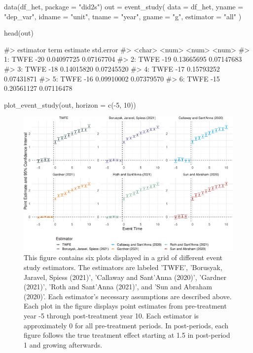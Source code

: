 \begin{Schunk}
\begin{Sinput}
data(df_het, package = "did2s")
out = event_study(
  data = df_het, yname = "dep_var", idname = "unit",
  tname = "year", gname = "g", estimator = "all"
)
\end{Sinput}
\end{Schunk}

\begin{Schunk}
\begin{Sinput}
head(out)
\end{Sinput}
\begin{Soutput}
#>    estimator  term   estimate  std.error
#>       <char> <num>      <num>      <num>
#> 1:      TWFE   -20 0.04097725 0.07167704
#> 2:      TWFE   -19 0.13665695 0.07147683
#> 3:      TWFE   -18 0.14015820 0.07245520
#> 4:      TWFE   -17 0.15793252 0.07431871
#> 5:      TWFE   -16 0.09910002 0.07379570
#> 6:      TWFE   -15 0.20561127 0.07116478
\end{Soutput}
\end{Schunk}

\begin{Schunk}
\begin{Sinput}
plot_event_study(out, horizon = c(-5, 10))
\end{Sinput}
\begin{figure}
\includegraphics[width=1\linewidth]{did2s_files/figure-latex/es-alternatives-1} \caption[This figure contains six plots displayed in a grid of different event study estimators]{This figure contains six plots displayed in a grid of different event study estimators. The estimators are labeled 'TWFE', 'Borusyak, Jaravel, Spiess (2021)', 'Callaway and Sant'Anna (2020)', 'Gardner (2021)', 'Roth and Sant'Anna (2021)', and 'Sun and Abraham (2020)'. Each estimator's necessary assumptions are described above. Each plot in the figure displays point estimates from pre-treatment year -5 through post-treatment year 10. Each estimator is approximately 0 for all pre-treatment periods. In post-periods, each figure follows the true treatment effect starting at 1.5 in post-period 1 and growing afterwards.}\label{fig:es-alternatives}
\end{figure}
\end{Schunk}

